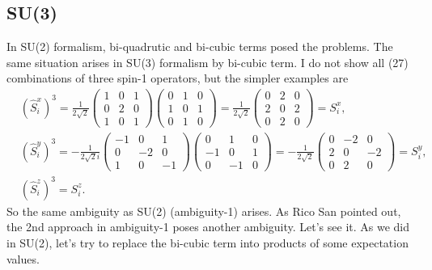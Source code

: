 \documentclass[11pt, aps, longbibliography]{article}
\begin{document}
\subsection{SU(3)}\label{sec:SU3}
In SU(2) formalism, bi-quadrutic and bi-cubic terms posed the problems. The same situation arises in SU(3) formalism by bi-cubic term.
I do not show all (27) combinations of three spin-1 operators, but the simpler examples are
\begin{align}
    &(\hat{S}_i^x)^3 = \frac{1}{2\sqrt{2}} \begin{pmatrix} 1 & 0 & 1 \\ 0 & 2 & 0 \\ 1 & 0 & 1\end{pmatrix}\begin{pmatrix} 0 & 1 & 0 \\ 1 & 0 & 1 \\ 0 & 1 & 0\end{pmatrix} =\frac{1}{2\sqrt{2}} \begin{pmatrix} 0 & 2 & 0 \\ 2 & 0 & 2 \\ 0 & 2 & 0  \end{pmatrix} = S_i^x, \\
    &(\hat{S}_i^y)^3 = -\frac{1}{2\sqrt{2}i} \begin{pmatrix} -1 & 0 & 1 \\ 0 & -2 & 0 \\ 1 & 0 & -1\end{pmatrix}\begin{pmatrix} 0 & 1 & 0 \\ -1 & 0 & 1 \\ 0 & -1 & 0\end{pmatrix} = -\frac{1}{2\sqrt{2}} \begin{pmatrix} 0 & -2 & 0 \\ 2 & 0 & -2 \\ 0 & 2 & 0  \end{pmatrix} = S_i^y, \\
    &(\hat{S}_i^z)^3 = S_i^z.
\end{align}
So the same ambiguity as SU(2) (ambiguity-1) arises. As Rico San pointed out, the 2nd approach in ambiguity-1 poses another ambiguity. Let's see it.
As we did in SU(2), let's try to replace the bi-cubic term into products of some expectation values.
\end{document}
